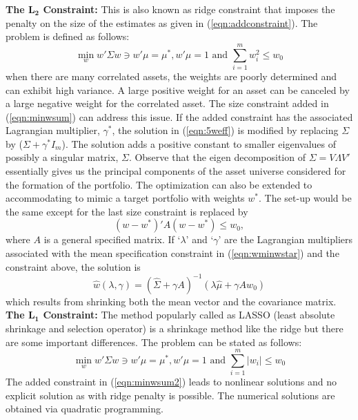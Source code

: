 \noindent \textbf{The $\mathbf{L_2}$ Constraint:} This is also known as ridge constraint that imposes the penalty on the size of the estimates as given in (\ref{eqn:addconstraint}). The problem is defined as follows:
	\begin{equation}\label{eqn:minwsum}
	\min_w w' \Sigma w \ni w' \mu=\mu^*, w'\mu=1 \text{ and }\sum_{i=1}^m w_i^2 \leq w_0
	\end{equation}
when there are many correlated assets, the weights are poorly determined and can exhibit high variance. A large positive weight for an asset can be canceled by a large negative weight for the correlated asset. The size constraint added in (\ref{eqn:minwsum}) can address this issue. If the added constraint has the associated Lagrangian multiplier, $\gamma^*$, the solution in (\ref{eqn:5weff}) is modified by replacing $\Sigma$ by ($\Sigma + \gamma^* I_m$). The solution adds a positive constant to smaller eigenvalues of possibly a singular matrix, $\Sigma$. Observe that the eigen decomposition of $\Sigma= V \Lambda V'$ essentially gives us the principal components of the asset universe considered for the formation of the portfolio. The optimization can also be extended to accommodating to mimic a target portfolio with weights $w^*$. The set-up would be the same except for the last size constraint is replaced by
	\begin{equation}\label{eqn:wminwstar}
	(w-w^*)' A(w-w^*) \leq w_0,
	\end{equation}
where $A$ is a general specified matrix. If `$\lambda$' and `$\gamma$' are the Lagrangian multipliers associated with the mean specification constraint in (\ref{eqn:wminwstar}) and the constraint above, the solution is
	\begin{equation}\label{eqn:hatwlambdagamma}
	\hat{w}(\lambda,\gamma)=(\hat{\Sigma} + \gamma A)^{-1} (\lambda \hat{\mu} + \gamma A w_0)
	\end{equation}
which results from shrinking both the mean vector and the covariance matrix. \\

\noindent \textbf{The $\mathbf{L_1}$ Constraint:} The method popularly called as LASSO (least absolute shrinkage and selection operator) is a shrinkage method like the ridge but there are some important differences. The problem can be stated as follows:
	\begin{equation}\label{eqn:minwsum2}
	\min_w w'\Sigma w \ni w'\mu=\mu^*, w'\mu=1 \text{ and } \sum_{i=1}^m |w_i| \leq w_0
	\end{equation}
The added constraint in (\ref{eqn:minwsum2}) leads to nonlinear solutions and no explicit solution as with ridge penalty is possible. The numerical solutions are obtained via quadratic programming.


